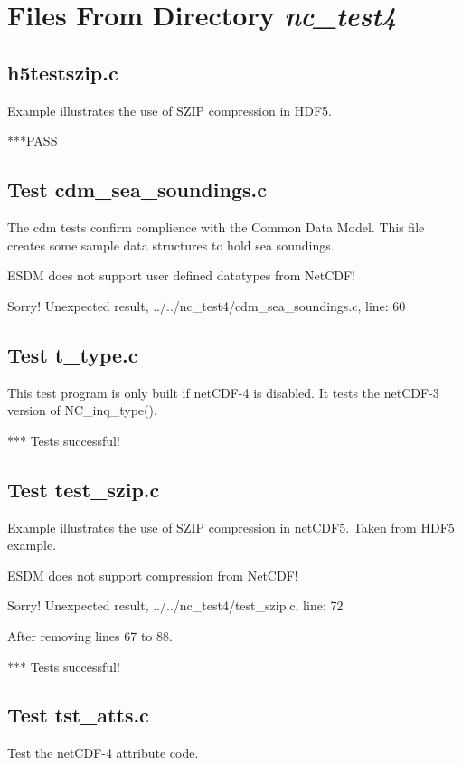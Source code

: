 \chapter{Files From Directory {\textit{nc\_test4}}}

\section{h5testszip.c}

Example illustrates the use of SZIP compression in HDF5.

***PASS

\section{Test cdm\_sea\_soundings.c}

The cdm tests confirm complience with the Common Data Model. This
file creates some sample data structures to hold sea soundings.

ESDM does not support user defined datatypes from NetCDF!

Sorry! Unexpected result, ../../nc\_test4/cdm\_sea\_soundings.c, line: 60

\section{Test t\_type.c}

This test program is only built if netCDF-4 is disabled. It tests
   the netCDF-3 version of NC\_inq\_type().

*** Tests successful!

\section{Test test\_szip.c}

Example illustrates the use of SZIP compression in netCDF5.
Taken from HDF5 example.

ESDM does not support compression from NetCDF!

Sorry! Unexpected result, ../../nc\_test4/test\_szip.c, line: 72

After removing lines 67 to 88.

*** Tests successful!

\section{Test tst\_atts.c}

Test the netCDF-4 attribute code.

